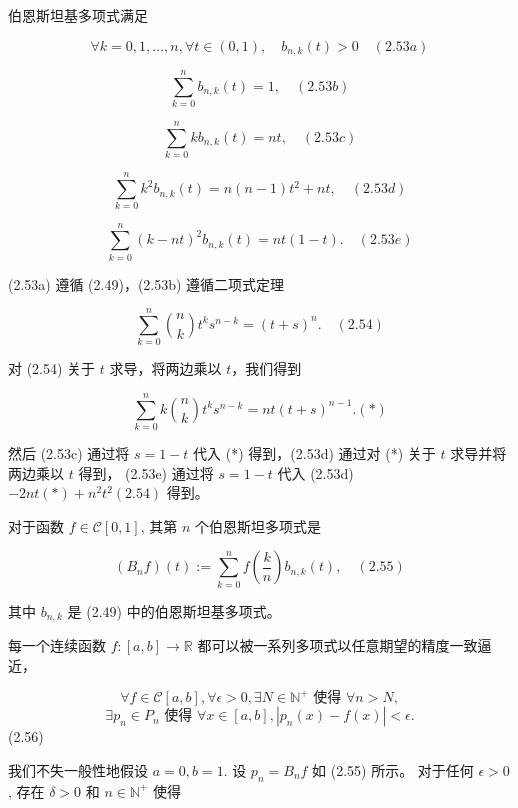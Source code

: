 \documentclass[a4paper]{ctexart}
\begin{document}
{ 伯恩斯坦基多项式满足

\[ \forall k=0,1,\ldots, n,\forall t\in(0,1),\quad b_{n, k}(t)>0 \quad (2.53 a) \]

\[ \sum_{k=0}^n b_{n, k}(t)=1, \quad (2.53 b) \]

\[ \sum_{k=0}^{n} k b_{n, k}(t)=n t, \quad (2.53 c) \]

\[ \sum_{k=0}^n k^2 b_{n, k}(t)=n(n-1) t^2+n t, \quad (2.53 d) \]

\[ \sum_{k=0}^n(k-n t)^2 b_{n, k}(t)=n t(1-t). \quad (2.53 e) \]

 (2.53a) 遵循 (2.49)，(2.53b) 遵循二项式定理

\[ \sum_{k=0}^n\binom{n}{k} t^k s^{n-k}=(t+s)^n. \quad (2.54) \]

对 (2.54) 关于 \(t\) 求导，将两边乘以 \(t\)，我们得到

\[ \sum_{k=0}^{n} k\binom{n}{k} t^{k} s^{n-k}=n t(t+s)^{n-1}. (*) \]

然后 (2.53c) 通过将 \(s=1-t\) 代入 (*) 得到，(2.53d) 通过对 (*) 关于 \(t\) 求导并将两边乘以 \(t\) 得到，
(2.53e) 通过将 \(s=1-t\) 代入 (2.53d) \(-2 n t(*)+n^{2} t^{2}(2.54)\) 得到。


 对于函数 \( f \in \mathcal{C}[0,1] \), 其第 \(n\) 个伯恩斯坦多项式是

\[ \left(B_{n} f\right)(t) := \sum_{k=0}^{n} f\left(\frac{k}{n}\right) b_{n, k}(t), \quad (2.55) \]

其中 \( b_{n, k} \) 是 (2.49) 中的伯恩斯坦基多项式。

 每一个连续函数 \( f:[a, b] \rightarrow \mathbb{R} \) 
都可以被一系列多项式以任意期望的精度一致逼近，

\[ \forall f \in \mathcal{C}[a, b], \forall \epsilon > 0, \exists N \in \mathbb{N}^{+} \text{ 使得 } \forall n > N, \]
\[ \exists p_{n} \in P_{n} \text{ 使得 } \forall x \in [a, b], \left| p_{n}(x) - f(x) \right| < \epsilon. \] (2.56)

 我们不失一般性地假设 \( a = 0, b = 1 \). 设 \( p_{n} = B_{n} f \) 如 (2.55) 所示。
对于任何 \( \epsilon > 0 \), 存在 \( \delta > 0 \) 和 \( n \in \mathbb{N}^{+} \) 使得

}
\end{document}
